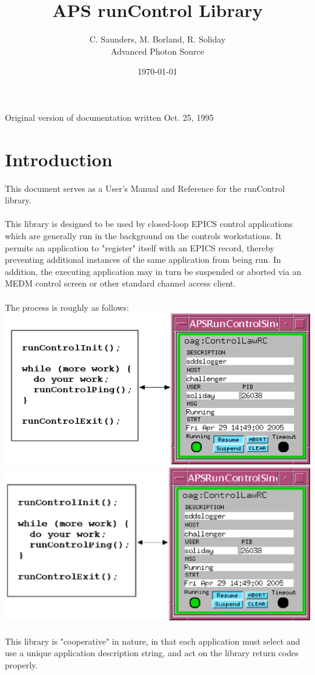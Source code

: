 \documentclass[11pt]{article}
\begin{document}
\title{APS runControl Library}
\author{C. Saunders, M. Borland, R. Soliday\\Advanced Photon Source}
\date{\today}
\maketitle

\begin{center}
Original version of documentation written Oct. 25, 1995
\end{center}

\section{Introduction}

This document serves as a User's Manual and Reference for the runControl library.\\
\\
This library is designed to be used by closed-loop EPICS control applications which are generally run in the background on the controls workstations. It permits an application to "register" itself with an EPICS record, thereby preventing additional instances of the same application from being run. In addition, the executing application may in turn be suspended or aborted via an MEDM control screen or other standard channel access client.\\
\\
The process is roughly as follows:\
\ifdefined\HCode
  \includegraphics{rc.png}\\
\else
  \includegraphics{rc.eps}\\
\fi
\\
This library is "cooperative" in nature, in that each application must select and use a unique application description string, and act on the library return codes properly.
\end{document}
